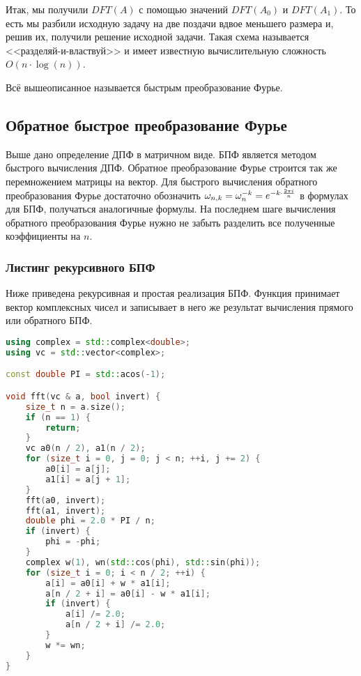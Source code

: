 Итак, мы получили $DFT(A)$ с помощью значений $DFT(A_0)$ и $DFT(A_1)$. То есть мы разбили исходную задачу на две поздачи вдвое меньшего размера и, решив их, получили решение исходной задачи. Такая схема называется <<разделяй-и-властвуй>> и имеет известную вычислительную сложность $O(n \cdot \log(n))$.

Всё вышеописанное называется быстрым преобразование Фурье.

\pagebreak

\subsection*{Обратное быстрое преобразование Фурье}
Выше дано определение ДПФ в матричном виде. БПФ является методом быстрого вычисления ДПФ. Обратное преобразование Фурье строится так же перемножением матрицы на вектор. Для быстрого вычисления обратного преобразования Фурье достаточно обозначить $\omega_{n, k} = {\omega}_{n} ^ {-k} = e ^ {-k \cdot {{2 \pi i} \over {n}}}$ в формулах для БПФ, получаться аналогичные формулы. На последнем шаге вычисления обратного преобразования Фурье нужно не забыть разделить все полученные коэффициенты на $n$.

\subsubsection*{Листинг рекурсивного БПФ}
Ниже приведена рекурсивная и простая реализация БПФ. Функция принимает вектор комплексных чисел и записывает в него же результат вычисления прямого или обратного БПФ.
\begin{lstlisting}[language=C++]
using complex = std::complex<double>;
using vc = std::vector<complex>;

const double PI = std::acos(-1);

void fft(vc & a, bool invert) {
    size_t n = a.size();
    if (n == 1) {
        return;
    }
    vc a0(n / 2), a1(n / 2);
    for (size_t i = 0, j = 0; j < n; ++i, j += 2) {
        a0[i] = a[j];
        a1[i] = a[j + 1];
    }
    fft(a0, invert);
    fft(a1, invert);
    double phi = 2.0 * PI / n;
    if (invert) {
        phi = -phi;
    }
    complex w(1), wn(std::cos(phi), std::sin(phi));
    for (size_t i = 0; i < n / 2; ++i) {
        a[i] = a0[i] + w * a1[i];
        a[n / 2 + i] = a0[i] - w * a1[i];
        if (invert) {
            a[i] /= 2.0;
            a[n / 2 + i] /= 2.0;
        }
        w *= wn;
    }
}
\end{lstlisting}

